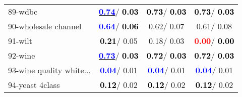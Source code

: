 \begin{table}[h]
\begin{center}
\begin{tabular}{lc|c|c}
89-wdbc & \underline{\textcolor{blue}{\textbf{  0.74}}}/\textcolor{black}{\textbf{  0.03}} & \textcolor{black}{\textbf{  0.73}}/\textcolor{black}{\textbf{  0.03}} & \textcolor{black}{\textbf{  0.73}}/\textcolor{black}{\textbf{  0.03}} \\
90-wholesale channel & \textcolor{blue}{\textbf{  0.64}}/\textcolor{black}{\textbf{  0.06}} &   0.62/  0.07 &   0.61/  0.08 \\
91-wilt & \textcolor{black}{\textbf{  0.21}}/  0.05 &   0.18/  0.03 & \textcolor{red}{\textbf{  0.00}}/\textcolor{black}{\textbf{  0.00}} \\
92-wine & \underline{\textcolor{blue}{\textbf{  0.73}}}/\textcolor{black}{\textbf{  0.03}} & \textcolor{black}{\textbf{  0.72}}/\textcolor{black}{\textbf{  0.03}} & \textcolor{black}{\textbf{  0.72}}/\textcolor{black}{\textbf{  0.03}} \\ \hline
93-wine quality white... & \textcolor{blue}{\textbf{  0.04}}/  0.01 & \textcolor{blue}{\textbf{  0.04}}/  0.01 & \textcolor{blue}{\textbf{  0.04}}/  0.01 \\
94-yeast 4class & \textcolor{black}{\textbf{  0.12}}/  0.02 & \textcolor{black}{\textbf{  0.12}}/  0.02 & \textcolor{black}{\textbf{  0.12}}/  0.02 \\\end{tabular}\label{stratsALCKappa2bCIELMRedux}
\end{center}
\end{table}
